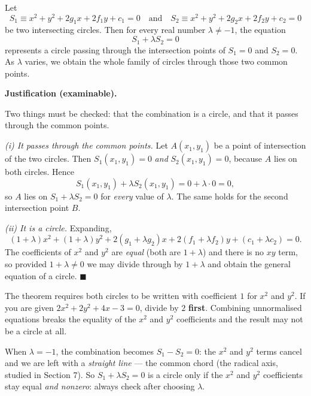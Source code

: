 \documentclass[11pt]{article}
\newcommand{\cle}[1]{{\popxbold\color{popdark}#1}}
\begin{document}
\begin{propriete}
Let
\[ S_1 \equiv x^2 + y^2 + 2g_1x + 2f_1y + c_1 = 0 \quad\text{and}\quad S_2 \equiv x^2 + y^2 + 2g_2x + 2f_2y + c_2 = 0 \]
be two intersecting circles. Then for every real number $\lambda \neq -1$, the equation
\[ S_1 + \lambda S_2 = 0 \]
represents a \cle{circle} passing through the intersection points of $S_1 = 0$ and $S_2 = 0$. As $\lambda$ varies, we obtain the whole family of circles through those two common points.
\end{propriete}

\textbf{Justification (examinable).}\par
Two things must be checked: that the combination is a circle, and that it passes through the common points.

\emph{(i) It passes through the common points.} Let $A(x_1, y_1)$ be a point of intersection of the two circles. Then $S_1(x_1, y_1) = 0$ \emph{and} $S_2(x_1, y_1) = 0$, because $A$ lies on both circles. Hence
\[ S_1(x_1, y_1) + \lambda S_2(x_1, y_1) = 0 + \lambda \cdot 0 = 0, \]
so $A$ lies on $S_1 + \lambda S_2 = 0$ for \emph{every} value of $\lambda$. The same holds for the second intersection point $B$.

\emph{(ii) It is a circle.} Expanding,
\[ (1+\lambda)x^2 + (1+\lambda)y^2 + 2(g_1 + \lambda g_2)x + 2(f_1 + \lambda f_2)y + (c_1 + \lambda c_2) = 0. \]
The coefficients of $x^2$ and $y^2$ are \emph{equal} (both are $1+\lambda$) and there is no $xy$ term, so provided $1 + \lambda \neq 0$ we may divide through by $1+\lambda$ and obtain the general equation of a circle. $\blacksquare$

\begin{attention}
The theorem requires both circles to be written with coefficient $1$ for $x^2$ and $y^2$. If you are given $2x^2 + 2y^2 + 4x - 3 = 0$, divide by $2$ \textbf{first}. Combining unnormalised equations breaks the equality of the $x^2$ and $y^2$ coefficients and the result may not be a circle at all.
\end{attention}

\begin{attention}[The degenerate case $\lambda = -1$]
When $\lambda = -1$, the combination becomes $S_1 - S_2 = 0$: the $x^2$ and $y^2$ terms cancel and we are left with a \emph{straight line} — the \cle{common chord} (the radical axis, studied in Section 7). So $S_1 + \lambda S_2 = 0$ is a circle only if the $x^2$ and $y^2$ coefficients stay equal \emph{and nonzero}: always check after choosing $\lambda$.
\end{attention}
\end{document}
